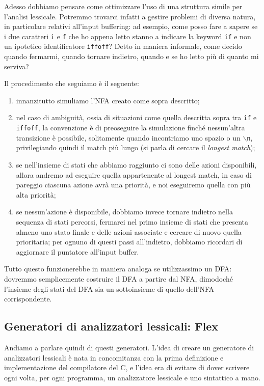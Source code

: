 \documentclass[class=book, crop=false, oneside, 12pt]{standalone}
\begin{document}
Adesso dobbiamo pensare come ottimizzare l'uso di una struttura simile per l'analisi lessicale. Potremmo trovarci infatti a gestire problemi di diversa natura, in particolare relativi all'input buffering: ad esempio, come posso fare a sapere se i due caratteri \texttt{i} e \texttt{f} che ho appena letto stanno a indicare la keyword \texttt{if} e non un ipotetico identificatore \texttt{iffoff}? Detto in maniera informale, come decido quando fermarmi, quando tornare indietro, quando e se ho letto più di quanto mi serviva?

Il procedimento che seguiamo è il seguente:
\begin{enumerate}
    \item innanzitutto simuliamo l'NFA creato come sopra descritto;
    \item nel caso di ambiguità, ossia di situazioni come quella descritta sopra tra \texttt{if} e \texttt{iffoff}, la convenzione è di preoseguire la simulazione finché nessun’altra transizione è possibile, solitamente quando incontriamo uno spazio o un \texttt{\(\backslash\)n}, privilegiando quindi il match più lungo (si parla di cercare il \emph{longest match});
    \item se nell'insieme di stati che abbiamo raggiunto ci sono delle azioni disponibili, allora andremo ad eseguire quella appartenente al longest match, in caso di pareggio ciascuna azione avrà una priorità, e noi eseguiremo quella con più alta priorità;
    \item se nessun'azione è disponibile, dobbiamo invece tornare indietro nella sequenza di stati percorsi, fermarci nel primo insieme di stati che presenta almeno uno stato finale e delle azioni associate e cercare di nuovo quella prioritaria; per ognuno di questi passi all'indietro, dobbiamo ricordari di aggiornare il puntatore all'input buffer.
\end{enumerate}

Tutto questo funzionerebbe in maniera analoga se utilizzassimo un DFA: dovremmo semplicemente costruire il DFA a partire dal NFA, dimodoché l'insieme degli stati del DFA sia un sottoinsieme di quello dell'NFA corrispondente.

\subsection{Generatori di analizzatori lessicali: Flex}
Andiamo a parlare quindi di questi generatori. L'idea di creare un generatore di analizzatori lessicali è nata in concomitanza con la prima definizione e implementazione del compilatore del C, e l'idea era di evitare di dover scrivere ogni volta, per ogni programma, un analizzatore lessicale e uno sintattico a mano.
\end{document}

